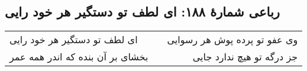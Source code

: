 \begin{center}
\section*{رباعی شمارهٔ ۱۸۸: ای لطف تو دستگیر هر خود رایی}
\label{sec:188}
\begin{longtable}{l p{0.5cm} r}
ای لطف تو دستگیر هر خود رایی
&&
وی عفو تو پرده پوش هر رسوایی
\\
بخشای بر آن بنده که اندر همه عمر
&&
جز درگه تو هیچ ندارد جایی
\\
\end{longtable}
\end{center}

